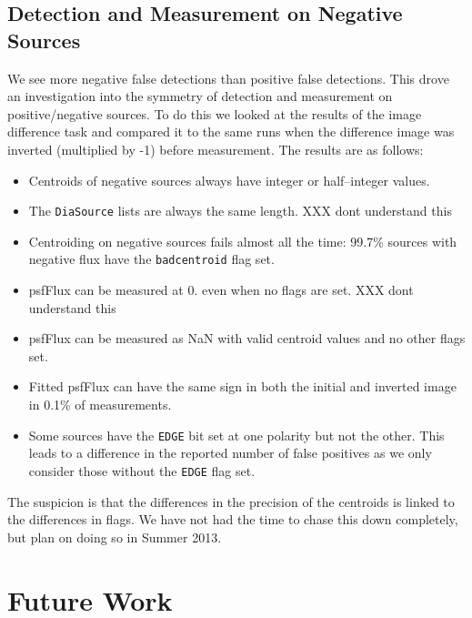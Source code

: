 \documentclass[prd, nofootinbib, floatfix, 11pt,tightenlines,times]{article}
\begin{document}
\subsection{Detection and Measurement on Negative Sources}
We see more negative false detections than positive false detections.  This drove an investigation 
into the symmetry of detection and measurement on positive/negative sources.  To do this we looked at the 
results of the image difference task and compared it to the same runs when the difference image was inverted
(multiplied by -1) before measurement.  The results are as follows:
\begin{itemize}
\item Centroids of negative sources always have integer or half--integer values.
\item The {\tt DiaSource} lists are always the same length.  {XXX dont
    understand this}
\item Centroiding on negative sources fails almost all the time: 99.7\% sources with negative flux
have the {\tt badcentroid} flag set.
\item psfFlux can be measured at 0. even when no flags are set.  {XXX dont
    understand this}
\item psfFlux can be measured as NaN with valid centroid values and no other flags set.
\item Fitted psfFlux can have the same sign in both the initial and inverted image in 0.1\% of measurements.
\item Some sources have the {\tt EDGE} bit set at one polarity but not the other.  
  This leads to a difference in the reported number of false positives as we only consider 
  those without the {\tt EDGE} flag set.
\end{itemize}

The suspicion is that the differences in the precision of the centroids is linked to the differences in flags.
We have not had the time to chase this down completely, but plan on doing so in Summer 2013.


\section{Future Work}
\end{document}
